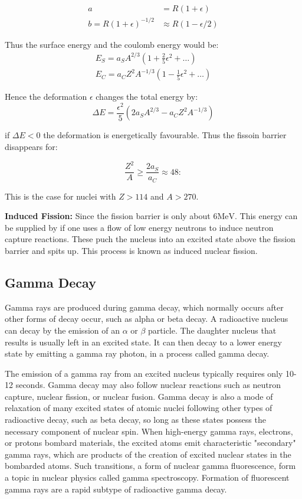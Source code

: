 \documentclass[10pt,a4paper]{article}
\newcommand{\mev}{\text{MeV}}
\begin{document}
\begin{align*}
    a &= R(1+\epsilon)\\
    b = R(1+\epsilon)^{-1/2} &\approx R(1-\epsilon/2)
\end{align*}

Thus the surface energy and the coulomb energy would be:
\begin{align}
    E_S = a_S A^{2/3}\left(1+\frac25\epsilon^2 + \dots\right)\\
    E_C = a_CZ^2A^{-1/3}\left(1-\frac15\epsilon^2+\dots\right)
\end{align}

Hence the deformation $\epsilon$ changes the total energy by:
\begin{equation}
    \Delta E = \frac{\epsilon^2}{5}\left(2a_SA^{2/3}-a_CZ^2A^{-1/3}\right)
\end{equation}

if $\Delta E<0$ the deformation is energetically favourable. Thus the fissoin barrier disappears for:

\begin{equation}
    \frac{Z^2}{A} \geq \frac{2a_S}{a_C}\approx 48:
\end{equation}

This is the case for nuclei with $Z>114$ and $A>270$.

\textbf{Induced Fission:} Since the fission barrier is only about $6\mev$. This energy can be supplied by if one uses a flow of low energy neutrons to induce neutron capture reactions. These puch  the nucleus into an excited state above the fission barrier and spits up. This process is known as induced nuclear fission.

\subsection{Gamma Decay}
Gamma rays are produced during gamma decay, which normally occurs after other forms of decay occur, such as alpha or beta decay. A radioactive nucleus can decay by the emission of an $\alpha$ or $\beta$ particle. The daughter nucleus that results is usually left in an excited state. It can then decay to a lower energy state by emitting a gamma ray photon, in a process called gamma decay.

The emission of a gamma ray from an excited nucleus typically requires only 10-12 seconds. Gamma decay may also follow nuclear reactions such as neutron capture, nuclear fission, or nuclear fusion. Gamma decay is also a mode of relaxation of many excited states of atomic nuclei following other types of radioactive decay, such as beta decay, so long as these states possess the necessary component of nuclear spin. When high-energy gamma rays, electrons, or protons bombard materials, the excited atoms emit characteristic "secondary" gamma rays, which are products of the creation of excited nuclear states in the bombarded atoms. Such transitions, a form of nuclear gamma fluorescence, form a topic in nuclear physics called gamma spectroscopy. Formation of fluorescent gamma rays are a rapid subtype of radioactive gamma decay.
\end{document}
